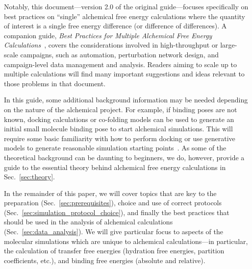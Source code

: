 \documentclass[9pt,bestpractices]{livecoms}
\begin{document}
Notably, this document---version 2.0 of the original guide---focuses specifically on best practices on ``single'' alchemical free energy calculations where the quantity of interest is a single free energy difference (or difference of differences). A companion guide, \textit{Best Practices for Multiple Alchemical Free Energy Calculations}~\cite{mey_largescale_inprep}, covers the considerations involved in high-throughput or large-scale campaigns, such as automation, perturbation network design, and campaign-level data management and analysis. Readers aiming to scale up to multiple calculations will find many important suggestions and ideas relevant to those problems in that document.

In this guide, some additional background information may be needed depending on the nature of the alchemical project. For example, if binding poses are not known, docking calculations or co-folding models can be used to generate an initial small molecule binding pose to start alchemical simulations\cite{scheen2025leveraging, thaler2025boltz, coskun_2023, beuming_2022}. This will require some basic familiarity with how to perform docking or use generative models to generate reasonable simulation starting points~\cite{grinter2014challenges}. 
As some of the theoretical background can be daunting to beginners, we do, however, provide a guide to the essential theory behind alchemical free energy calculations in Sec.~\ref{sec:theory}.

In the remainder of this paper, we will cover topics that are key to the preparation (Sec.~\ref{sec:prerequisites}), choice and use of correct protocols (Sec.~\ref{sec:simulation_protocol_choice}), and finally the best practices that should be used in the analysis of alchemical calculations (Sec.~\ref{sec:data_analysis}). 
We will give particular focus to aspects of the molecular simulations which are unique to alchemical calculations---in particular, the calculation of transfer free energies (hydration free energies, partition coefficients, etc.), and binding free energies (absolute and relative). 
\end{document}
